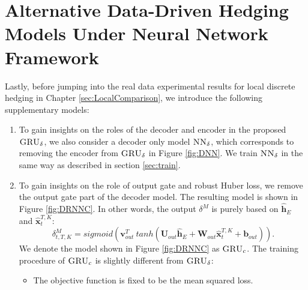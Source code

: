 \documentclass[letterpaper,12pt,titlepage,oneside,final]{book}
\numberwithin{equation}{section}
\theoremstyle{definition}
\newcommand{\model}{\textsc{GRU}_\delta}
\newcommand{\modelN}{\textsc{NN}_\delta}
\newcommand{\vb}{\mathbf{b}}
\newcommand{\vx}{\mathbf{x}}
\newcommand{\vv}{\mathbf{v}}
\newcommand{\vW}{\pmb{W}}
\newcommand{\vU}{\pmb{U}}
\begin{document}
\section{Alternative Data-Driven Hedging Models Under Neural Network Framework}
\label{sec:alternativeModel}
Lastly, before jumping into the real data experimental results for local discrete hedging in Chapter \ref{sec:LocalComparison}, we introduce the following supplementary models:
\begin{enumerate}
	\item To gain insights on the roles of the decoder and encoder in the proposed $\model$,  we  also consider a decoder only model $\modelN$, which corresponds to removing the encoder from $\model$ in Figure \ref{fig:DNN}.  We train  $\modelN$ in the same way  as described in section \ref{sec:train}. 
	\item To gain insights on the role of output gate and robust Huber loss, we remove the output gate part of the decoder model. The resulting model  is shown in Figure \ref{fig:DRNNC}. In other words, the output $\delta^M$ is purely based on $\mathbf{\widehat{h}}_E$ and $ \widehat{\vx}_{t}^{T,K}$:
	\[
		{\delta}^M_{t,T,K}=sigmoid (\vv^T_{out} \ tanh( \vU_{out} \mathbf{\widehat{h}}_E + \vW_{out} \widehat{\vx}_{t}^{T,K}+ \vb_{out})).
	\]
	We denote the model shown in Figure \ref{fig:DRNNC} as $\textsc{GRU}_{c}$. The training procedure of $\textsc{GRU}_{c}$ is slightly different from $\model$:
	\begin{itemize}
		\item The objective function is fixed to be the mean squared loss.
	\end{itemize}
\end{enumerate}
\end{document}
